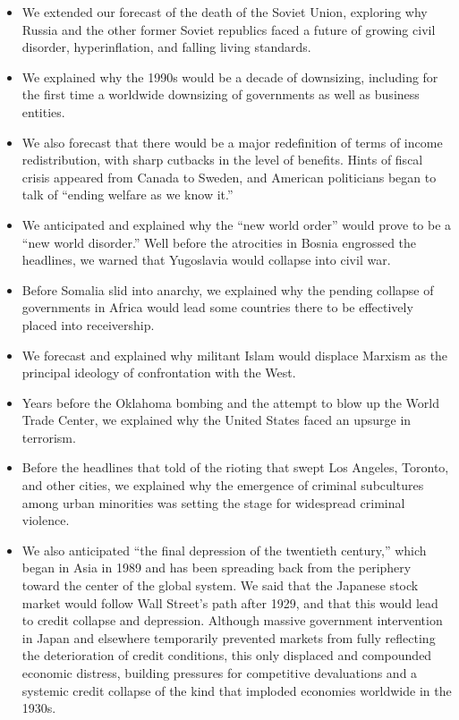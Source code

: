 \begin{paracol}{2}
\switchcolumn
\begin{itemize}
    \item We extended our forecast of the death of the Soviet Union, exploring why Russia and the other former Soviet republics faced a future of growing civil disorder, hyperinflation, and falling living standards. 
    \item We explained why the 1990s would be a decade of downsizing, including for the first time a worldwide downsizing of governments as well as business entities.
    \item We also forecast that there would be a major redefinition of terms of income redistribution, with sharp cutbacks in the level of benefits. Hints of fiscal crisis appeared from Canada to Sweden, and American politicians began to talk of ``ending welfare as we know it.''
    \item We anticipated and explained why the ``new world order'' would prove to be a ``new world disorder.'' Well before the atrocities in Bosnia engrossed the headlines, we warned that Yugoslavia would collapse into civil war.
    \item Before Somalia slid into anarchy, we explained why the pending collapse of governments in Africa would lead some countries there to be effectively placed into receivership.
    \item We forecast and explained why militant Islam would displace Marxism as the principal ideology of confrontation with the West.
    \item Years before the Oklahoma bombing and the attempt to blow up the World Trade Center, we explained why the United States faced an upsurge in terrorism.
    \item Before the headlines that told of the rioting that swept Los Angeles, Toronto, and other cities, we explained why the emergence of criminal subcultures among urban minorities was setting the stage for widespread criminal violence.
    \item We also anticipated ``the final depression of the twentieth century,'' which began in Asia in 1989 and has been spreading back from the periphery toward the center of the global system. We said that the Japanese stock market would follow Wall Street's path after 1929, and that this would lead to credit collapse and depression. Although massive government intervention in Japan and elsewhere temporarily prevented markets from fully reflecting the deterioration of credit conditions, this only displaced and compounded economic distress, building pressures for competitive devaluations and a systemic credit collapse of the kind that imploded economies worldwide in the 1930s.
\end{itemize}


\end{paracol}
